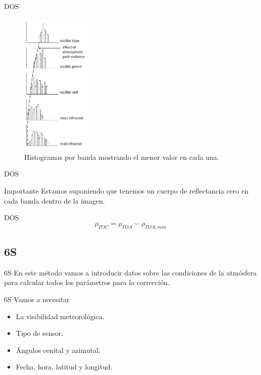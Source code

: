 \documentclass[handout]{beamer}
\begin{document}
\begin{frame}{DOS}
  \begin{figure}
  \centering
  \includegraphics[width=0.30\textwidth]{imagenes/dos.png}
  \caption{Histogramas por banda mostrando el menor valor en cada una.}
  \end{figure}
\end{frame}

\begin{frame}{DOS}
  \begin{alertblock}{Importante}
    Estamos suponiendo que tenemos un cuerpo de reflectancia cero en cada banda dentro de la imagen.
  \end{alertblock}
\end{frame}

\begin{frame}{DOS}
  \begin{equation}
    \rho_{TOC} = \rho_{TOA} - \rho_{TOA,min}
  \end{equation}
\end{frame}

\subsection{6S}
\begin{frame}{6S}
  En este método vamos a introducir datos sobre las condiciones de la atmósfera para calcular todos los parámetros para la corrección.
\end{frame}

\begin{frame}{6S}
  Vamos a necesitar
  \begin{itemize}
    \item La visibilidad meteorológica.
    \item Tipo de sensor.
    \item Ángulos cenital y azimutal.
    \item Fecha, hora, latitud y longitud.
  \end{itemize}
\end{frame}
\end{document}
